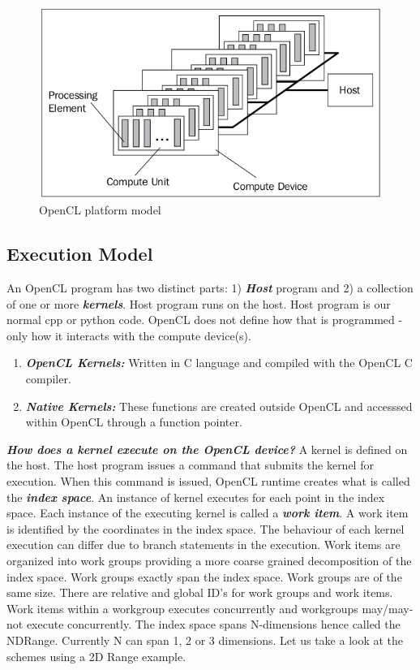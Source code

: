\documentclass[10pt]{article}
\begin{document}
\begin{figure}[H]
  \centering
  \includegraphics[scale=0.4]{./images/platform_model.png}
  \caption{OpenCL platform model}
  \label{platform_model}
\end{figure}

\subsection{Execution Model}
An OpenCL program has two distinct parts: 1) \textbf{\textit{Host}} program and 2) a collection of one or more \textbf{\textit{kernels}}. Host program runs on the host. Host program is our normal cpp or python code. OpenCL does not define how that is programmed - only how it interacts with the compute device(s).
\begin{enumerate}
	\item \textbf{\textit{OpenCL Kernels:}} Written in C language and compiled with the OpenCL C compiler.
	\item \textbf{\textit{Native Kernels:}} These functions are created outside OpenCL and accesssed within OpenCL through a function pointer.
\end{enumerate}

\textit{\textbf{How does a kernel execute on the OpenCL device?}} A kernel is defined on the host. The host program issues a command that submits the kernel for execution. When this command is issued, OpenCL runtime creates what is called the \textit{\textbf{index space}}. An instance of kernel executes for each point in the index space. Each instance of the executing kernel is called a \textit{\textbf{work item}}. A work item is identified by the coordinates in the index space. The behaviour of each kernel execution can differ due to branch statements in the execution. Work items are organized into work groups providing a more coarse grained decomposition of the index space. Work groups exactly span the index space. Work groups are of the same size. There are relative and global ID's for work groups and work items. Work items within a workgroup executes concurrently and workgroups may/may-not execute concurrently. The index space spans N-dimensions hence called the NDRange. Currently N can span 1, 2 or 3 dimensions. Let us take a look at the schemes using a 2D Range example.
\end{document}
